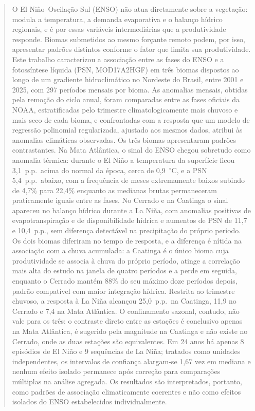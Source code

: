 \documentclass[a4paper,fleqn]{cas-sc}
\begin{document}
\begin{abstract}
O El Niño--Oscilação Sul (ENSO) não atua diretamente sobre a vegetação: modula a temperatura, a demanda evaporativa e o balanço hídrico regionais, e é por essas variáveis intermediárias que a produtividade responde. Biomas submetidos ao mesmo forçante remoto podem, por isso, apresentar padrões distintos conforme o fator que limita sua produtividade. Este trabalho caracterizou a associação entre as fases do ENSO e a fotossíntese líquida (PSN, MOD17A2HGF) em três biomas dispostos ao longo de um gradiente hidroclimático no Nordeste do Brasil, entre 2001 e 2025, com 297 períodos mensais por bioma. As anomalias mensais, obtidas pela remoção do ciclo anual, foram comparadas entre as fases oficiais da NOAA, estratificadas pelo trimestre climatologicamente mais chuvoso e mais seco de cada bioma, e confrontadas com a resposta que um modelo de regressão polinomial regularizada, ajustado aos mesmos dados, atribui às anomalias climáticas observadas. Os três biomas apresentaram padrões contrastantes. Na Mata Atlântica, o sinal do ENSO chegou sobretudo como anomalia térmica: durante o El Niño a temperatura da superfície ficou 3,1~p.p.\ acima do normal da época, cerca de 0,9~$^{\circ}$C, e a PSN 5,4~p.p.\ abaixo, com a frequência de meses extremamente baixos subindo de 4,7\% para 22,4\% enquanto as medianas brutas permaneceram praticamente iguais entre as fases. No Cerrado e na Caatinga o sinal apareceu no balanço hídrico durante a La Niña, com anomalias positivas de evapotranspiração e de disponibilidade hídrica e aumentos de PSN de 11,7 e 10,4~p.p., sem diferença detectável na precipitação do próprio período. Os dois biomas diferiram no tempo de resposta, e a diferença é nítida na associação com a chuva acumulada: a Caatinga é o único bioma cuja produtividade se associa à chuva do próprio período, atinge a correlação mais alta do estudo na janela de quatro períodos e a perde em seguida, enquanto o Cerrado mantém 88\% do seu máximo doze períodos depois, padrão compatível com maior integração hídrica. Restrita ao trimestre chuvoso, a resposta à La Niña alcançou 25,0~p.p.\ na Caatinga, 11,9 no Cerrado e 7,4 na Mata Atlântica. O confinamento sazonal, contudo, não vale para os três: o contraste direto entre as estações é conclusivo apenas na Mata Atlântica, é sugerido pela magnitude na Caatinga e não existe no Cerrado, onde as duas estações são equivalentes. Em 24 anos há apenas 8 episódios de El Niño e 9 sequências de La Niña; tratados como unidades independentes, os intervalos de confiança alargam-se 1,67 vez em mediana e nenhum efeito isolado permanece após correção para comparações múltiplas na análise agregada. Os resultados são interpretados, portanto, como padrões de associação climaticamente coerentes e não como efeitos isolados do ENSO estabelecidos individualmente.
\end{abstract}
\end{document}
